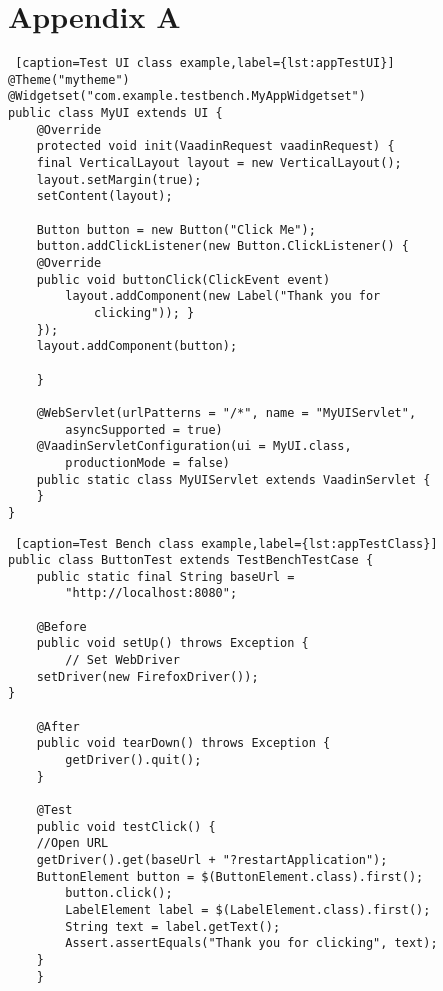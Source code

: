 	
\appendix
\section{Appendix A}
\label{appendixA}
	 
\lstset{style=a1listing}
\begin{lstlisting} [caption=Test UI class example,label={lst:appTestUI}]
@Theme("mytheme")
@Widgetset("com.example.testbench.MyAppWidgetset")
public class MyUI extends UI {
	@Override
	protected void init(VaadinRequest vaadinRequest) {
	final VerticalLayout layout = new VerticalLayout();
	layout.setMargin(true);
	setContent(layout);

	Button button = new Button("Click Me");
	button.addClickListener(new Button.ClickListener() {
	@Override
	public void buttonClick(ClickEvent event) 
		layout.addComponent(new Label("Thank you for
			clicking")); }
	});
	layout.addComponent(button);

	}
    
	@WebServlet(urlPatterns = "/*", name = "MyUIServlet",
		asyncSupported = true)
	@VaadinServletConfiguration(ui = MyUI.class,
		productionMode = false)
	public static class MyUIServlet extends VaadinServlet {
	}
}
\end{lstlisting}

\lstset{style=a1listing}
\begin{lstlisting} [caption=Test Bench class example,label={lst:appTestClass}]
public class ButtonTest extends TestBenchTestCase {
	public static final String baseUrl =
		"http://localhost:8080";
    
	@Before
	public void setUp() throws Exception {
		// Set WebDriver
	setDriver(new FirefoxDriver());
}

	@After
	public void tearDown() throws Exception {
		getDriver().quit();
	}
    
	@Test
	public void testClick() {
	//Open URL
	getDriver().get(baseUrl + "?restartApplication");
	ButtonElement button = $(ButtonElement.class).first();
		button.click();
		LabelElement label = $(LabelElement.class).first();
		String text = label.getText();
		Assert.assertEquals("Thank you for clicking", text);
	}
    }
\end{lstlisting}